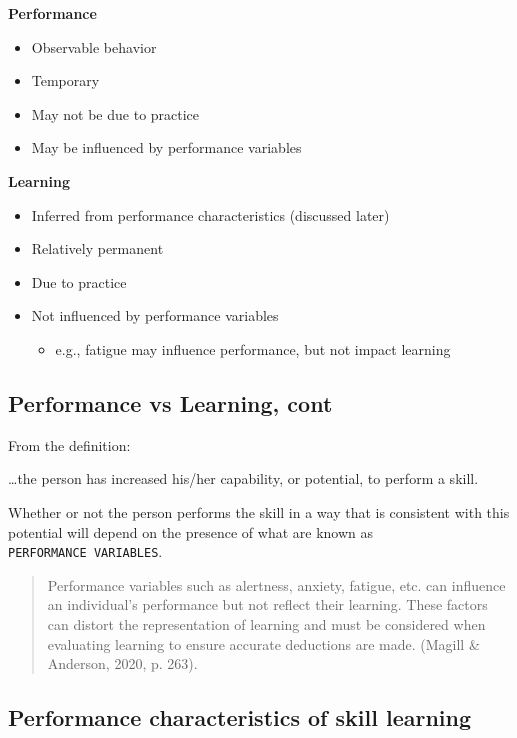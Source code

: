 \documentclass[
  letterpaper,
  DIV=11,
  numbers=noendperiod]{scrartcl}
\providecommand{\tightlist}{%
  \setlength{\itemsep}{0pt}\setlength{\parskip}{0pt}}\usepackage{longtable,booktabs,array}
\begin{document}
\textbf{Performance}

\begin{itemize}
\tightlist
\item
  Observable behavior
\item
  Temporary
\item
  May not be due to practice
\item
  May be influenced by performance variables
\end{itemize}

\textbf{Learning}

\begin{itemize}
\tightlist
\item
  Inferred from performance characteristics (discussed later)
\item
  Relatively permanent
\item
  Due to practice
\item
  Not influenced by performance variables

  \begin{itemize}
  \tightlist
  \item
    e.g., fatigue may influence performance, but not impact learning
  \end{itemize}
\end{itemize}

\hypertarget{performance-vs-learning-cont-1}{%
\subsection{Performance vs Learning,
cont}\label{performance-vs-learning-cont-1}}

From the definition:

\ldots the person has increased his/her capability, or potential, to
perform a skill.

Whether or not the person performs the skill in a way that is consistent
with this potential will depend on the presence of what are known as
\texttt{PERFORMANCE\ VARIABLES}.

\begin{quote}
Performance variables such as alertness, anxiety, fatigue, etc. can
influence an individual's performance but not reflect their learning.
These factors can distort the representation of learning and must be
considered when evaluating learning to ensure accurate deductions are
made. (Magill \& Anderson, 2020, p. 263).
\end{quote}

\hypertarget{performance-characteristics-of-skill-learning}{%
\subsection{Performance characteristics of skill
learning}\label{performance-characteristics-of-skill-learning}}
\end{document}
